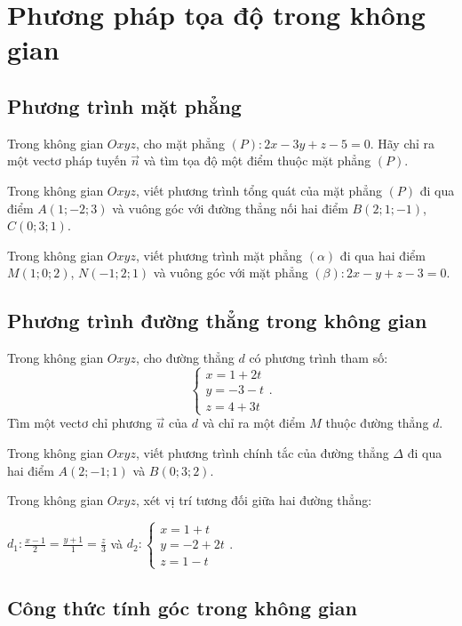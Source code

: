 \chapter{Phương pháp tọa độ trong không gian}

\section{Phương trình mặt phẳng}

\exercise Trong không gian $Oxyz$, cho mặt phẳng $(P): 2x - 3y + z - 5 = 0$. Hãy chỉ ra một vectơ pháp tuyến $\vec{n}$ và tìm tọa độ một điểm thuộc mặt phẳng $(P)$.

\exercise Trong không gian $Oxyz$, viết phương trình tổng quát của mặt phẳng $(P)$ đi qua điểm $A(1; -2; 3)$ và vuông góc với đường thẳng nối hai điểm $B(2; 1; -1)$, $C(0; 3; 1)$.

\exercise Trong không gian $Oxyz$, viết phương trình mặt phẳng $(\alpha)$ đi qua hai điểm $M(1; 0; 2)$, $N(-1; 2; 1)$ và vuông góc với mặt phẳng $(\beta): 2x - y + z - 3 = 0$.

\section{Phương trình đường thẳng trong không gian}

\exercise Trong không gian $Oxyz$, cho đường thẳng $d$ có phương trình tham số:
$$\begin{cases} x = 1 + 2t \\ y = -3 - t \\ z = 4 + 3t \end{cases}.$$
Tìm một vectơ chỉ phương $\vec{u}$ của $d$ và chỉ ra một điểm $M$ thuộc đường thẳng $d$.

\exercise Trong không gian $Oxyz$, viết phương trình chính tắc của đường thẳng $\Delta$ đi qua hai điểm $A(2; -1; 1)$ và $B(0; 3; 2)$.

\exercise Trong không gian $Oxyz$, xét vị trí tương đối giữa hai đường thẳng:
\begin{center}
   $d_1: \frac{x - 1}{2} = \frac{y + 1}{1} = \frac{z}{3}$ và $d_2: \begin{cases} x = 1 + t \\ y = -2 + 2t \\ z = 1 - t \end{cases}$.
\end{center}

\section{Công thức tính góc trong không gian}

